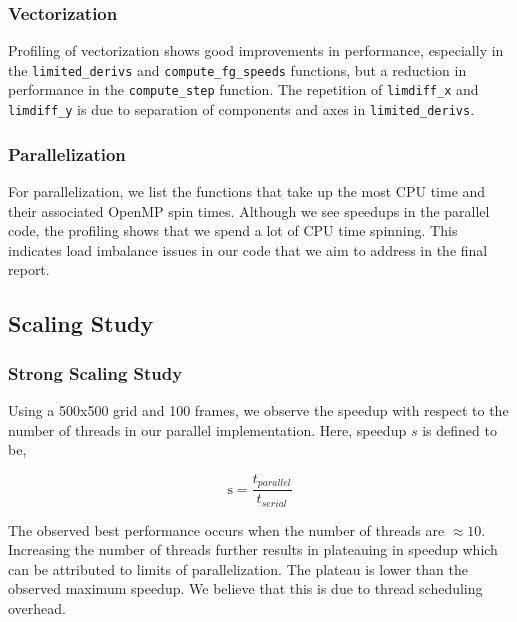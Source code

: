 \documentclass[11pt]{article}
\begin{document}
\subsubsection{Vectorization}
Profiling of vectorization shows good improvements in performance, especially in the \texttt{limited\_derivs} and \texttt{compute\_fg\_speeds} functions, but a reduction in performance in the \texttt{compute\_step} function. The repetition of \texttt{limdiff\_x} and \texttt{limdiff\_y} is due to separation of components and axes in \texttt{limited\_derivs}. 


\subsubsection{Parallelization}
For parallelization, we list the functions that take up the most CPU time and their associated OpenMP spin times. Although we see speedups in the parallel code, the profiling shows that we spend a lot of CPU time spinning. This indicates load imbalance issues in our code that we aim to address in the final report. 




\subsection{Scaling Study} \label{sec:speedup}


\subsubsection{Strong Scaling Study}
Using a 500x500 grid and 100 frames, we observe the speedup with respect to the number of threads in our parallel implementation. Here, speedup $s$ is defined to be,  

\begin{equation}
	\mathrm{s} = \dfrac{t_{parallel}}{t_{serial}}
\end{equation}

The observed best performance occurs when the number of threads are $\approx10$. Increasing the number of threads further results in plateauing in speedup which can be attributed to limits of parallelization. The plateau is lower than the observed maximum speedup. We believe that this is due to thread scheduling overhead. 
\end{document}
